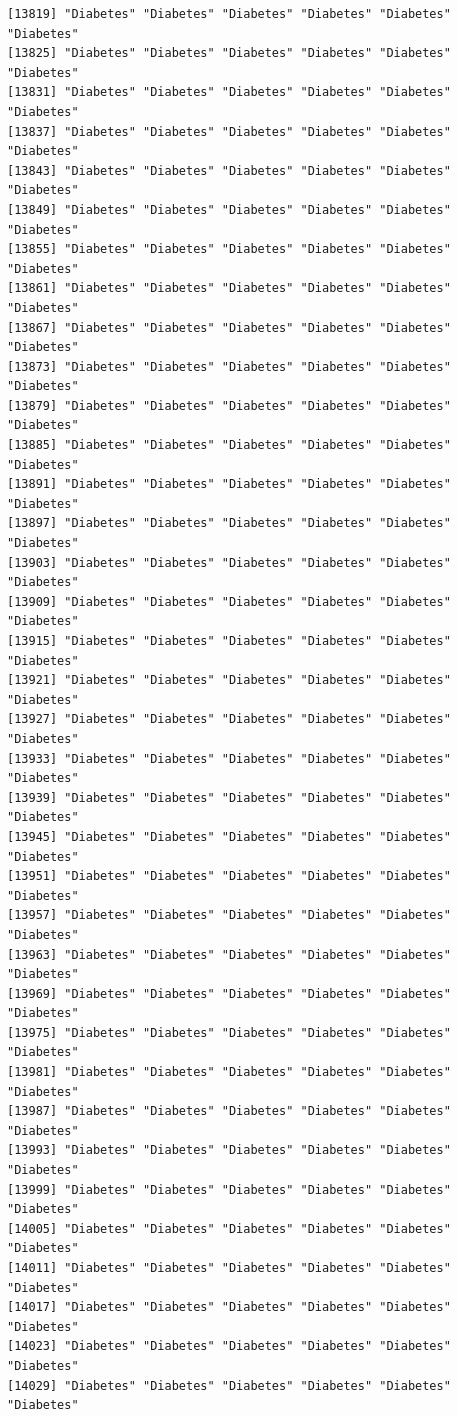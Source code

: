 \documentclass[
  letterpaper,
  DIV=11,
  numbers=noendperiod]{scrartcl}
\begin{document}
\begin{verbatim}
[13819] "Diabetes" "Diabetes" "Diabetes" "Diabetes" "Diabetes" "Diabetes"
[13825] "Diabetes" "Diabetes" "Diabetes" "Diabetes" "Diabetes" "Diabetes"
[13831] "Diabetes" "Diabetes" "Diabetes" "Diabetes" "Diabetes" "Diabetes"
[13837] "Diabetes" "Diabetes" "Diabetes" "Diabetes" "Diabetes" "Diabetes"
[13843] "Diabetes" "Diabetes" "Diabetes" "Diabetes" "Diabetes" "Diabetes"
[13849] "Diabetes" "Diabetes" "Diabetes" "Diabetes" "Diabetes" "Diabetes"
[13855] "Diabetes" "Diabetes" "Diabetes" "Diabetes" "Diabetes" "Diabetes"
[13861] "Diabetes" "Diabetes" "Diabetes" "Diabetes" "Diabetes" "Diabetes"
[13867] "Diabetes" "Diabetes" "Diabetes" "Diabetes" "Diabetes" "Diabetes"
[13873] "Diabetes" "Diabetes" "Diabetes" "Diabetes" "Diabetes" "Diabetes"
[13879] "Diabetes" "Diabetes" "Diabetes" "Diabetes" "Diabetes" "Diabetes"
[13885] "Diabetes" "Diabetes" "Diabetes" "Diabetes" "Diabetes" "Diabetes"
[13891] "Diabetes" "Diabetes" "Diabetes" "Diabetes" "Diabetes" "Diabetes"
[13897] "Diabetes" "Diabetes" "Diabetes" "Diabetes" "Diabetes" "Diabetes"
[13903] "Diabetes" "Diabetes" "Diabetes" "Diabetes" "Diabetes" "Diabetes"
[13909] "Diabetes" "Diabetes" "Diabetes" "Diabetes" "Diabetes" "Diabetes"
[13915] "Diabetes" "Diabetes" "Diabetes" "Diabetes" "Diabetes" "Diabetes"
[13921] "Diabetes" "Diabetes" "Diabetes" "Diabetes" "Diabetes" "Diabetes"
[13927] "Diabetes" "Diabetes" "Diabetes" "Diabetes" "Diabetes" "Diabetes"
[13933] "Diabetes" "Diabetes" "Diabetes" "Diabetes" "Diabetes" "Diabetes"
[13939] "Diabetes" "Diabetes" "Diabetes" "Diabetes" "Diabetes" "Diabetes"
[13945] "Diabetes" "Diabetes" "Diabetes" "Diabetes" "Diabetes" "Diabetes"
[13951] "Diabetes" "Diabetes" "Diabetes" "Diabetes" "Diabetes" "Diabetes"
[13957] "Diabetes" "Diabetes" "Diabetes" "Diabetes" "Diabetes" "Diabetes"
[13963] "Diabetes" "Diabetes" "Diabetes" "Diabetes" "Diabetes" "Diabetes"
[13969] "Diabetes" "Diabetes" "Diabetes" "Diabetes" "Diabetes" "Diabetes"
[13975] "Diabetes" "Diabetes" "Diabetes" "Diabetes" "Diabetes" "Diabetes"
[13981] "Diabetes" "Diabetes" "Diabetes" "Diabetes" "Diabetes" "Diabetes"
[13987] "Diabetes" "Diabetes" "Diabetes" "Diabetes" "Diabetes" "Diabetes"
[13993] "Diabetes" "Diabetes" "Diabetes" "Diabetes" "Diabetes" "Diabetes"
[13999] "Diabetes" "Diabetes" "Diabetes" "Diabetes" "Diabetes" "Diabetes"
[14005] "Diabetes" "Diabetes" "Diabetes" "Diabetes" "Diabetes" "Diabetes"
[14011] "Diabetes" "Diabetes" "Diabetes" "Diabetes" "Diabetes" "Diabetes"
[14017] "Diabetes" "Diabetes" "Diabetes" "Diabetes" "Diabetes" "Diabetes"
[14023] "Diabetes" "Diabetes" "Diabetes" "Diabetes" "Diabetes" "Diabetes"
[14029] "Diabetes" "Diabetes" "Diabetes" "Diabetes" "Diabetes" "Diabetes"

\end{verbatim}
\end{document}
